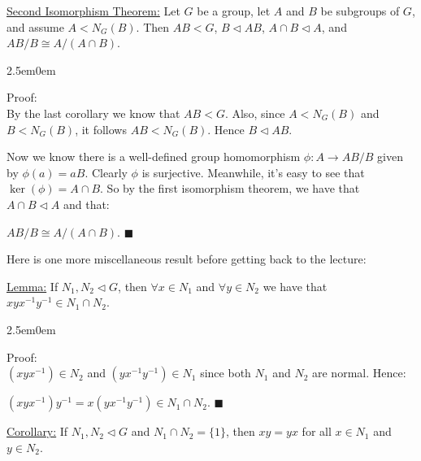 \documentclass{book}
\newcommand{\hTwo}{%
\color{Black}%
   \fontsize{13}{15}\selectfont%
}
\newcommand{\exTwo}{%
   \color{Purple}%
   \fontsize{13}{15}\selectfont%
}
\newcommand{\exThreeP}{%
   \color{RedViolet}%
   \fontsize{12}{14}\selectfont%
}
\newenvironment{myIndent}{%
   \begin{adjustwidth}{2.5em}{0em}%
}{%
   \end{adjustwidth}%
}
\newcommand{\mySepTwo}[1][.]{%
   {\noindent\color{#1}{\rule{6.5in}{0.5mm}}}\\%
}
\newcommand{\retTwo}{\hfill\bigbreak}
\begin{document}
\ul{Second Isomorphism Theorem:} Let $G$ be a group, let $A$ and $B$ be subgroups of $G$, and assume $A < N_G(B)$. Then $AB < G$, $B \lhd AB$, $A \cap B \lhd A$, and $AB/B \cong A/(A\cap B)$.

\begin{myIndent}\exThreeP
	Proof:\\
	By the last corollary we know that $AB < G$. Also, since $A < N_G(B)$ and $B < N_G(B)$, it follows $AB < N_G(B)$. Hence $B \lhd AB$.\retTwo

	Now we know there is a well-defined group homomorphism $\phi: A \to AB/B$ given by $\phi(a) = aB$. Clearly $\phi$ is surjective. Meanwhile, it's easy to see that $\ker(\phi) = A \cap B$. So by the first isomorphism theorem, we have that $A \cap B \lhd A$ and that:
	
	{\centering $AB/B \cong A/(A\cap B)$. $\blacksquare$\retTwo\par}
\end{myIndent}

\hTwo Here is one more miscellaneous result before getting back to the lecture:\retTwo

\exTwo\ul{Lemma:} If $N_1, N_2 \lhd G$, then $\forall x \in N_1$ and $\forall y \in N_2$ we have that $xyx^{-1}y^{-1} \in N_1 \cap N_2$.

\begin{myIndent}\exThreeP
	Proof:\\
	$(xyx^{-1}) \in N_2$ and $(yx^{-1}y^{-1}) \in N_1$ since both $N_1$ and $N_2$ are normal. Hence:
	
	{\centering$(xyx^{-1})y^{-1} = x(yx^{-1}y^{-1}) \in N_1 \cap N_2$. $\blacksquare$\retTwo\par}
\end{myIndent}

\ul{Corollary:} If $N_1, N_2 \lhd G$ and $N_1 \cap N_2 = \{1\}$, then $xy = yx$ for all $x \in N_1$ and $y \in N_2$.

\hTwo\mySepTwo
\end{document}
